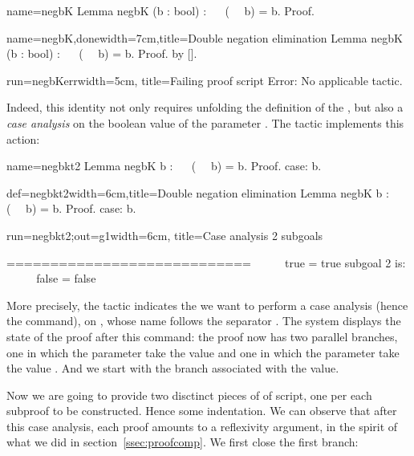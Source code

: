 \begin{coqdef}{name=negbK}
Lemma negbK (b : bool) : ~~ (~~ b) = b.
Proof.
\end{coqdef}
\begin{coq}{name=negbK,done}{width=7cm,title=Double negation elimination}
Lemma negbK (b : bool) : ~~ (~~ b) = b.
Proof. by [].
\end{coq}
\begin{coqout}{run=negbKerr}{width=5cm, title=Failing proof script}
Error: No applicable tactic.
\end{coqout}

Indeed, this identity not only requires unfolding the definition of
the , but also a \emph{case analysis} on the boolean value of
the parameter . The tactic  implements this action:

\begin{coqdef}{name=negbkt2}
Lemma negbK b : ~~ (~~ b) = b.
Proof.
case: b.
\end{coqdef}
\begin{coq}{def=negbkt2}{width=6cm,title=Double negation elimination}
Lemma negbK b : ~~ (~~ b) = b.
Proof.
case: b.
$~$
$~$
$~$
\end{coq}
\begin{coqout}{run=negbkt2;out=g1}{width=6cm, title=Case analysis}
2 subgoals

  ============================
   ~~ ~~ true = true
subgoal 2 is:
 ~~ ~~ false = false
\end{coqout}

More precisely, the tactic  indicates the we want to
perform a case analysis (hence the  command), on , whose
name follows the separator \C{:}. The \Coq{} system displays the state
of the proof after this command: the proof now has two parallel
branches, one in which the parameter  take the value  and
one in which the parameter  take the value . And we
start with the branch associated with the  value.

Now we are going to provide two disctinct pieces of of script, one per
each subproof to be constructed. Hence some indentation. We can
observe that after this case analysis, each proof amounts to a
reflexivity argument, in the spirit of what we did in
section~\ref{ssec:proofcomp}. We first close the first branch:

